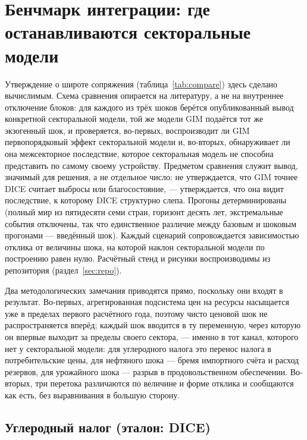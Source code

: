 \documentclass[11pt,a4paper]{article}
\begin{document}
\clearpage
\section{Бенчмарк интеграции: где останавливаются секторальные модели}
\label{app:benchmark}

Утверждение о широте сопряжения (таблица~\ref{tab:compare}) здесь сделано вычислимым. Схема
сравнения опирается на литературу, а не на внутреннее отключение блоков: для каждого из трёх
шоков берётся опубликованный вывод конкретной секторальной модели, той же модели GIM подаётся
тот же экзогенный шок, и проверяется, во-первых, воспроизводит ли GIM первопорядковый эффект
секторальной модели и, во-вторых, обнаруживает ли она межсекторное последствие, которое
секторальная модель не способна представить по самому своему устройству. Предметом сравнения
служит вывод, значимый для решения, а не отдельное число: не утверждается, что GIM точнее DICE
считает выбросы или благосостояние, --- утверждается, что она видит последствие, к которому DICE
структурно слепа. Прогоны детерминированы (полный мир из пятидесяти семи стран, горизонт десять
лет, экстремальные события отключены, так что единственное различие между базовым и шоковым
прогонами --- введённый шок). Каждый сценарий сопровождается зависимостью отклика от величины
шока, на которой наклон секторальной модели по построению равен нулю. Расчётный стенд и рисунки
воспроизводимы из репозитория (раздел~\ref{sec:repo}).

Два методологических замечания приводятся прямо, поскольку они входят в результат. Во-первых,
агрегированная подсистема цен на ресурсы насыщается уже в пределах первого расчётного года,
поэтому чисто ценовой шок не распространяется вперёд; каждый шок вводится в ту переменную, через
которую он впервые выходит за пределы своего сектора, --- именно в тот канал, которого нет у
секторальной модели: для углеродного налога это перенос налога в потребительские цены, для
нефтяного шока --- бремя импортного счёта и расход резервов, для урожайного шока --- разрыв в
продовольственном обеспечении. Во-вторых, три перетока различаются по величине и форме отклика и
сообщаются как есть, без выравнивания в большую сторону.

\subsection{Углеродный налог (эталон: DICE)}
\end{document}
